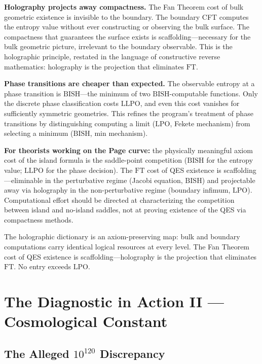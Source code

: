\documentclass[11pt,a4paper]{report}
\theoremstyle{plain}
\theoremstyle{definition}
\theoremstyle{remark}
\newcommand{\BISH}{\mathrm{BISH}}
\newcommand{\LLPO}{\mathrm{LLPO}}
\newcommand{\LPO}{\mathrm{LPO}}
\newcommand{\FT}{\mathrm{FT}}
\begin{document}
\textbf{Holography projects away compactness.} The Fan Theorem cost of bulk geometric existence is invisible to the boundary. The boundary CFT computes the entropy value without ever constructing or observing the bulk surface. The compactness that guarantees the surface exists is scaffolding---necessary for the bulk geometric picture, irrelevant to the boundary observable. This is the holographic principle, restated in the language of constructive reverse mathematics: holography is the projection that eliminates $\FT$.

\textbf{Phase transitions are cheaper than expected.} The observable entropy at a phase transition is $\BISH$---the minimum of two $\BISH$-computable functions. Only the discrete phase classification costs $\LLPO$, and even this cost vanishes for sufficiently symmetric geometries. This refines the program's treatment of phase transitions by distinguishing computing a limit ($\LPO$, Fekete mechanism) from selecting a minimum ($\BISH$, min mechanism).

\textbf{For theorists working on the Page curve:} the physically meaningful axiom cost of the island formula is the saddle-point competition ($\BISH$ for the entropy value; $\LLPO$ for the phase decision). The $\FT$ cost of QES existence is scaffolding---eliminable in the perturbative regime (Jacobi equation, $\BISH$) and projectable away via holography in the non-perturbative regime (boundary infimum, $\LPO$). Computational effort should be directed at characterizing the competition between island and no-island saddles, not at proving existence of the QES via compactness methods.

\begin{chapterbox}
The holographic dictionary is an axiom-preserving map: bulk and boundary computations carry identical logical resources at every level. The Fan Theorem cost of QES existence is scaffolding---holography is the projection that eliminates $\FT$. No entry exceeds $\LPO$.
\end{chapterbox}

\chapter{The Diagnostic in Action II --- Cosmological Constant}

\section{The Alleged $10^{120}$ Discrepancy}
\end{document}
